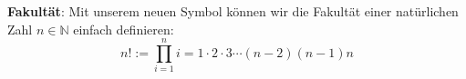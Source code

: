 \begin{definition}[Produkte]
    
\end{definition}

\begin{example}
    \begin{thmenum}
        \item \textbf{Fakultät}: Mit unserem neuen Symbol können wir die Fakultät einer natürlichen Zahl \(n \in \mathbb N\) einfach definieren: 
        \begin{equation*}
            n! := \prod_{i=1}^n i = 1\cdot 2 \cdot 3 \cdots (n-2)(n-1)n
        \end{equation*}

        \item 
    \end{thmenum}
\end{example}

\begin{proposition}
    
\end{proposition}
